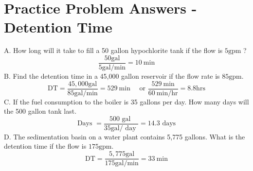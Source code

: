 \section{Practice Problem Answers - Detention Time}
A. How long will it take to fill a 50 gallon hypochlorite tank if the flow is $5 \mathrm{gpm}$ ?
$$
\frac{50 \mathrm{gal}}{5 \mathrm{gal} / \mathrm{min}}=10 \mathrm{~min}
$$
B. Find the detention time in a 45,000 gallon reservoir if the flow rate is $85 \mathrm{gpm}$.
$$
\mathrm{DT}=\frac{45,000 \mathrm{gal}}{85 \mathrm{gal} / \mathrm{min}}=529 \mathrm{~min} \quad \text { or } \frac{529 \mathrm{~min}}{60 \mathrm{~min} / \mathrm{hr}}=8.8 \mathrm{hrs}
$$
C. If the fuel consumption to the boiler is 35 gallons per day. How many days will the 500 gallon tank last.
$$
\text { Days }=\frac{500 \text { gal }}{35 \mathrm{gal} / \text { day }}=14.3 \text { days }
$$
D. The sedimentation basin on a water plant contains 5,775 gallons. What is the detention time if the flow is $175 \mathrm{gpm}$.
$$
\mathrm{DT}=\frac{5,775 \mathrm{gal}}{175 \mathrm{gal} / \mathrm{min}}=33 \mathrm{~min}
$$

